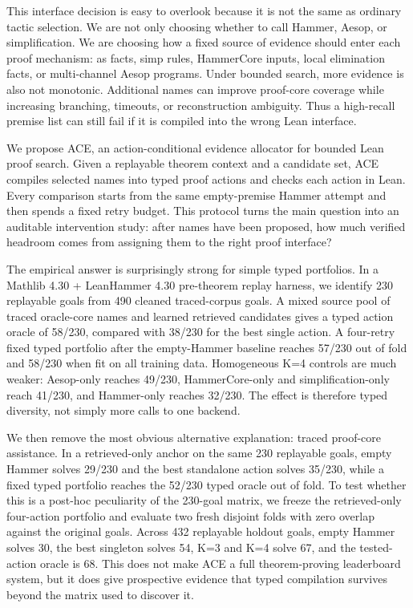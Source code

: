 \documentclass{article}
\newcommand{\tap}{\textsc{ACE}}
\begin{document}
This interface decision is easy to overlook because it is not the same as ordinary tactic selection. We are not only choosing whether to call Hammer, Aesop, or simplification. We are choosing how a fixed source of evidence should enter each proof mechanism: as facts, simp rules, HammerCore inputs, local elimination facts, or multi-channel Aesop programs. Under bounded search, more evidence is also not monotonic. Additional names can improve proof-core coverage while increasing branching, timeouts, or reconstruction ambiguity. Thus a high-recall premise list can still fail if it is compiled into the wrong Lean interface.

We propose \tap, an action-conditional evidence allocator for bounded Lean proof search. Given a replayable theorem context and a candidate set, \tap{} compiles selected names into typed proof actions and checks each action in Lean. Every comparison starts from the same empty-premise Hammer attempt and then spends a fixed retry budget. This protocol turns the main question into an auditable intervention study: after names have been proposed, how much verified headroom comes from assigning them to the right proof interface?

The empirical answer is surprisingly strong for simple typed portfolios. In a Mathlib 4.30 + LeanHammer 4.30 pre-theorem replay harness, we identify 230 replayable goals from 490 cleaned traced-corpus goals. A mixed source pool of traced oracle-core names and learned retrieved candidates gives a typed action oracle of 58/230, compared with 38/230 for the best single action. A four-retry fixed typed portfolio after the empty-Hammer baseline reaches 57/230 out of fold and 58/230 when fit on all training data. Homogeneous K=4 controls are much weaker: Aesop-only reaches 49/230, HammerCore-only and simplification-only reach 41/230, and Hammer-only reaches 32/230. The effect is therefore typed diversity, not simply more calls to one backend.

We then remove the most obvious alternative explanation: traced proof-core assistance. In a retrieved-only anchor on the same 230 replayable goals, empty Hammer solves 29/230 and the best standalone action solves 35/230, while a fixed typed portfolio reaches the 52/230 typed oracle out of fold. To test whether this is a post-hoc peculiarity of the 230-goal matrix, we freeze the retrieved-only four-action portfolio and evaluate two fresh disjoint folds with zero overlap against the original goals. Across 432 replayable holdout goals, empty Hammer solves 30, the best singleton solves 54, K=3 and K=4 solve 67, and the tested-action oracle is 68. This does not make \tap{} a full theorem-proving leaderboard system, but it does give prospective evidence that typed compilation survives beyond the matrix used to discover it.
\end{document}
